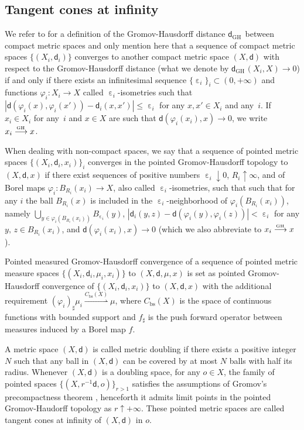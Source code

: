 \documentclass[JEP,XML,SOM,Unicode,published]{cedram}
\def\To#1{\mathchoice{\xrightarrow{\textstyle\kern4pt#1\kern3pt}}{\stackrel{#1}{\longrightarrow}}{}{}}
\newcommand{\sGH}{{\scriptscriptstyle\mathrm{GH}\,}}
\theoremstyle{plain}
\theoremstyle{definition}
\let\eps\upepsilon
\let\phi\varphi
\newcommand{\bs}{\mathrm{bs}}
\newcommand{\dist}{\mathsf{d}}
\begin{document}
\subsection*{Tangent cones at infinity}

We refer to \cite{Gromov} for a definition of the Gromov-Hausdorff distance $\dist_{\sGH}$ between compact metric spaces and only mention here that a sequence of compact metric spaces $\{(X_i,\dist_i)\}$ converges to another compact metric space $(X,\dist)$ with respect to the Gromov-Hausdorff distance (what we denote by $\dist_{\sGH}(X_i,X) \to 0$) if and only if there exists an infinitesimal sequen\-ce $\{\eps_i\}_i \subset (0,+\infty)$ and functions $\phi_i: X_i \to X$ called $\eps_i$-isometries such that \hbox{$|\dist(\phi_i(x),\phi_i(x'))-\dist_i(x,x')|\le \eps_i$} for any $x,x' \in X_i$ and any~$i$. If $x_i \in X_i$ for any~$i$ and $x \in X$ are such that $\dist(\phi_i(x_i),x) \to 0$, we write $x_i \To{\sGH} x$.

When dealing with non-compact spaces, we say that a sequence of pointed metric spaces $\{(X_i, \dist_i, x_i)\}_i$ converges in the pointed Gromov-Hausdorff topology to $(X, \dist, x)$ if there exist sequences of positive numbers $\eps_i \downarrow 0$, $R_i \uparrow \infty$, and of Borel maps $\phi_i:B_{R_i}(x_i) \to X$, also called $\eps_i$-isometries, such that such that for any $i$ the ball $B_{R_i}(x)$ is included in the $\eps_i$-neighborhood of $\phi_i(B_{R_i}(x_i))$, namely $ \bigcup_{y \in \phi_i(B_{R_i}(x_i))} B_{\eps_i}(y)$, $|\dist_i(y, z)-\dist(\phi_i(y), \phi_i(z))|<\eps_i$ for any $y,\, z \in B_{R_i}(x_i)$, and $\dist(\phi_i(x_i),x)\to 0$ (which we also abbreviate to $x_i \To{\sGH} x$).

Pointed measured Gromov-Hausdorff convergence of a sequence of pointed metric measure spaces $\{(X_i, \dist_i, \mu_i, x_i)\}$ to $(X, \dist,\mu,x)$ is set as pointed Gromov-Hausdorff convergence of $\{(X_i, \dist_i, x_i)\}$ to $(X, \dist, x)$ with the additional requirement \hbox{$(\phi_i)_{\sharp}\mu_i \!\stackrel{C_\bs(X)}{\rightharpoonup}\! \mu$}, where $C_\bs(X)$ is the space of continuous functions with bounded support and $ f_\sharp $ is
the push forward operator between measures induced by a Borel map $f$.

A metric space $(X,\dist)$ is called metric doubling if there exists a positive integer $N$ such that any ball in $(X,\dist)$ can be covered by at most $N$ balls with half its radius. Whenever $(X,\dist)$ is a doubling space, for any $o \in X$, the family of pointed spaces $\{(X,r^{-1}\dist,o)\}_{r>1}$ satisfies the assumptions of Gromov's precompactness theorem \cite[Prop.\,5.2]{Gromov}, henceforth it admits limit points in the pointed Gromov-Haudorff topology as $r\uparrow +\infty$. These pointed metric spaces are called tangent cones at infinity of $(X,\dist)$ in $o$.
\end{document}
